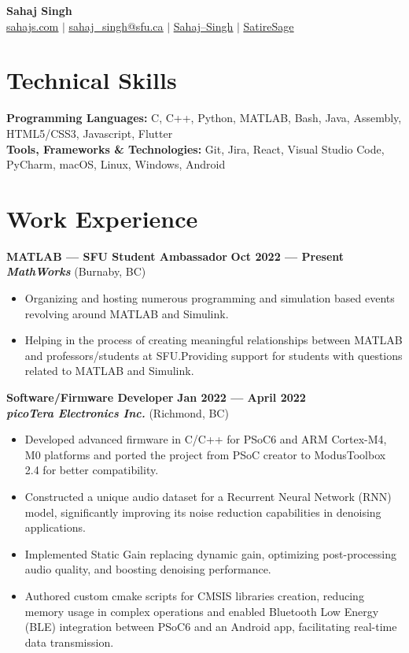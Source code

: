 \documentclass[letterpaper,11pt]{article}
\newcommand{\contact} [5] {
    \begin{center}
        \textbf{\color{colorValue}\Huge #1} \\ \vspace{1pt}
        \small \href{https://#2}{\faIcon{code} \underline{#2}} $|$ \href{mailto:#3}{\faIcon{envelope} \underline{#3}} $|$ 
        \href{#4}{\faIcon{linkedin} \underline{Sahaj--Singh}} $|$
        \href{#5}{\faIcon{github} \underline{SatireSage}}
    \end{center}
}
\newcommand{\Item} [1] {
    \item\small{{#1 \vspace{-2pt}}}
}
\newcommand{\employer} [5] {
    {\textbf{#3} \hfill \textbf{#4 --- #5}\\ \textbf{\emph{#1}} (#2)\\}
}
\newcommand{\workItemListStart} [0] {
    \vspace{-1pt}
    \begin{itemize}[leftmargin=*,topsep=0pt,itemsep=-2pt]
}
\newcommand{\workItemListEnd} [0] {
    \end{itemize}
    \vspace{1pt}
}
\begin{document}
    \vspace*{-30pt}

    \contact{Sahaj Singh}{sahajs.com}{sahaj\_singh@sfu.ca}{https://www.linkedin.com/in/sahaj--singh/}{https://github.com/SatireSage}

    \section{Technical Skills}
    \begin{itemize}[leftmargin=0.15in, label={}]
    \small{\item{
        \textbf{Programming Languages:}{ C, C++, Python, MATLAB, Bash, Java, Assembly, HTML5/CSS3, Javascript, Flutter} \\
        \textbf{Tools, Frameworks \& Technologies:}{ Git, Jira, React, Visual Studio Code, PyCharm, macOS, Linux, Windows, Android} \\
    }}
    \end{itemize}

    \section{Work Experience}
    \employer{MathWorks}{Burnaby, BC}{MATLAB --- SFU Student Ambassador}{Oct 2022}{Present}
    \workItemListStart{}
        \Item{Organizing and hosting numerous programming and simulation based events revolving around MATLAB and Simulink.}
        \Item{Helping in the process of creating meaningful relationships between MATLAB and professors/students at SFU.\@ Providing support for students with questions related to MATLAB and Simulink.}
    \workItemListEnd{}
    \employer{picoTera Electronics Inc.}{Richmond, BC}{Software/Firmware Developer}{Jan 2022}{April 2022}
    \workItemListStart{}
        \Item{Developed advanced firmware in C/C++ for PSoC6 and ARM Cortex-M4, M0 platforms and ported the project from PSoC creator to ModusToolbox 2.4 for better compatibility.}
        \Item{Constructed a unique audio dataset for a Recurrent Neural Network (RNN) model, significantly improving its noise reduction capabilities in denoising applications.}
        \Item{Implemented Static Gain replacing dynamic gain, optimizing post-processing audio quality, and boosting denoising performance.}
        \Item{Authored custom cmake scripts for CMSIS libraries creation, reducing memory usage in complex operations and enabled Bluetooth Low Energy (BLE) integration between PSoC6 and an Android app, facilitating real-time data transmission.}
    \workItemListEnd{}
\end{document}
